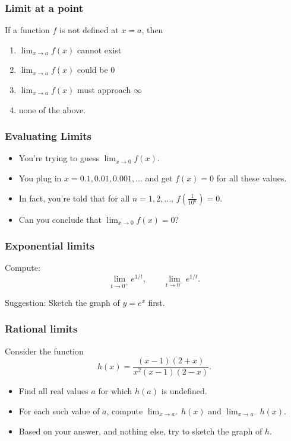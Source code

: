 \documentclass[14pt]{beamer}
\begin{document}
\begin{frame}
	\frametitle{Limit at a point}

	If a function $f$ is not defined at $x=a$, then
	\begin{enumerate}
		\item $\displaystyle{\lim_{x\rightarrow a} f(x)}$ cannot exist

		\item $\displaystyle{\lim_{x\rightarrow a} f(x)}$ could be $0$

		\item $\displaystyle{\lim_{x\rightarrow a} f(x)}$ must approach $\infty$

		\item none of the above.
	\end{enumerate}
\end{frame}

\begin{frame}
	\frametitle{Evaluating Limits}

	\begin{itemize}
		\item You're trying to guess $\displaystyle{\lim_{x \rightarrow 0} f(x)}$.

		\item You plug in $x=0.1, 0.01, 0.001, \dots$ and get $f(x)=0$ for all these
			values.

		\item In fact, you're told that for all $n=1, 2, \dots$, $\displaystyle{f\left(\frac{1}{10^{n}}\right)}
			=0$. \\

		\item Can you conclude that $\displaystyle \lim_{x \rightarrow 0}f(x)=0$?
	\end{itemize}
\end{frame}

\begin{frame}
	\frametitle{Exponential limits}

	Compute:
	\[
		\lim_{t \to 0^+}e^{1/t}, \quad \quad \lim_{t \to 0^-}e^{1/t}.
	\]

	Suggestion: Sketch the graph of $\displaystyle y=e^{x}$ first.
\end{frame}

\begin{frame}[t]
	\frametitle{Rational limits}

	Consider the function
	\[
		h(x) = \frac{(x-1)(2+x)}{x^{2}(x-1)(2-x)}.
	\]
	\begin{itemize}
		\item Find all real values $a$ for which $h(a)$ is undefined. \\

		\item For each such value of $a$, compute
			$\displaystyle \lim_{x \to a^+}h(x)$ and
			$\displaystyle \lim_{x \to a^-}h(x)$. \\

		\item Based on your answer, and nothing else, try to sketch the graph of $h$.
	\end{itemize}
\end{frame}
\end{document}
